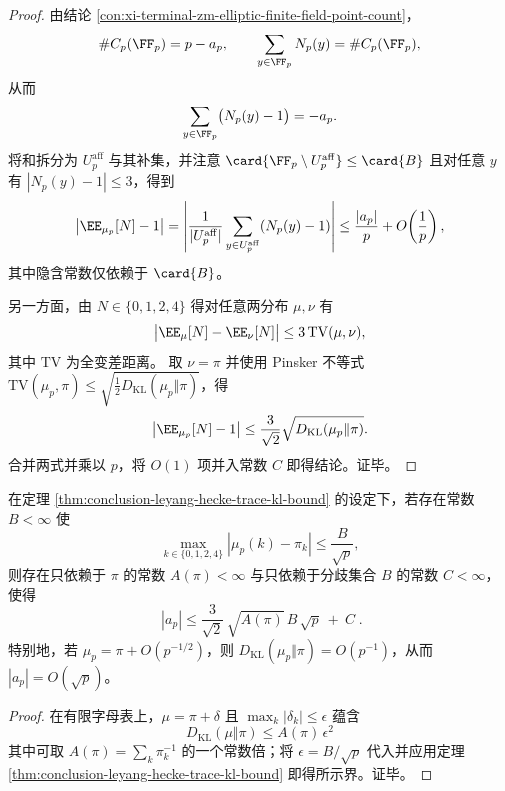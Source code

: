 \begin{proof}
由结论 \ref{con:xi-terminal-zm-elliptic-finite-field-point-count}，
\[
\#C_p(\FF_p)=p-a_p,
\qquad
\sum_{y\in\FF_p}N_p(y)=\#C_p(\FF_p),
\]
从而
\[
\sum_{y\in\FF_p}\bigl(N_p(y)-1\bigr)=-a_p.
\]
将和拆分为 \(U_p^{\mathrm{aff}}\) 与其补集，并注意 \(\card{\FF_p\setminus U_p^{\mathrm{aff}}}\le \card{B}\) 且对任意 \(y\) 有 \(|N_p(y)-1|\le 3\)，得到
\[
\left|\EE_{\mu_p}[N]-1\right|
=\left|\frac{1}{|U_p^{\mathrm{aff}}|}\sum_{y\in U_p^{\mathrm{aff}}}(N_p(y)-1)\right|
\le
\frac{|a_p|}{p}+O\!\left(\frac{1}{p}\right),
\]
其中隐含常数仅依赖于 \(\card{B}\)。
\par
另一方面，由 \(N\in\{0,1,2,4\}\) 得对任意两分布 \(\mu,\nu\) 有
\[
\bigl|\EE_\mu[N]-\EE_\nu[N]\bigr|
\le
3\,\mathrm{TV}(\mu,\nu),
\]
其中 \(\mathrm{TV}\) 为全变差距离。
取 \(\nu=\pi\) 并使用 Pinsker 不等式
\(
\mathrm{TV}(\mu_p,\pi)\le \sqrt{\tfrac12 D_{\mathrm{KL}}(\mu_p\Vert\pi)}
\)，得
\[
\left|\EE_{\mu_p}[N]-1\right|
\le
\frac{3}{\sqrt 2}\sqrt{D_{\mathrm{KL}}(\mu_p\Vert\pi)}.
\]
合并两式并乘以 \(p\)，将 \(O(1)\) 项并入常数 \(C\) 即得结论。证毕。
\end{proof}

\begin{corollary}\label{cor:conclusion-leyang-chebotarev-hasse-via-kl}
在定理 \ref{thm:conclusion-leyang-hecke-trace-kl-bound} 的设定下，若存在常数 \(B<\infty\) 使
\[
\max_{k\in\{0,1,2,4\}}|\mu_p(k)-\pi_k|\le \frac{B}{\sqrt p},
\]
则存在只依赖于 \(\pi\) 的常数 \(A(\pi)<\infty\) 与只依赖于分歧集合 \(B\) 的常数 \(C<\infty\)，使得
\[
\boxed{\;
|a_p|
\le
\frac{3}{\sqrt 2}\,\sqrt{A(\pi)}\,B\,\sqrt p
\ +\ C\; }.
\]
特别地，若 \(\mu_p=\pi+O(p^{-1/2})\)，则 \(D_{\mathrm{KL}}(\mu_p\Vert\pi)=O(p^{-1})\)，从而 \(|a_p|=O(\sqrt p)\)。
\end{corollary}

\begin{proof}
在有限字母表上，\(\mu=\pi+\delta\) 且 \(\max_k|\delta_k|\le \epsilon\) 蕴含
\[
D_{\mathrm{KL}}(\mu\Vert\pi)\le A(\pi)\,\epsilon^2
\]
其中可取 \(A(\pi)=\sum_k \pi_k^{-1}\) 的一个常数倍；将 \(\epsilon=B/\sqrt p\) 代入并应用定理 \ref{thm:conclusion-leyang-hecke-trace-kl-bound} 即得所示界。证毕。
\end{proof}

